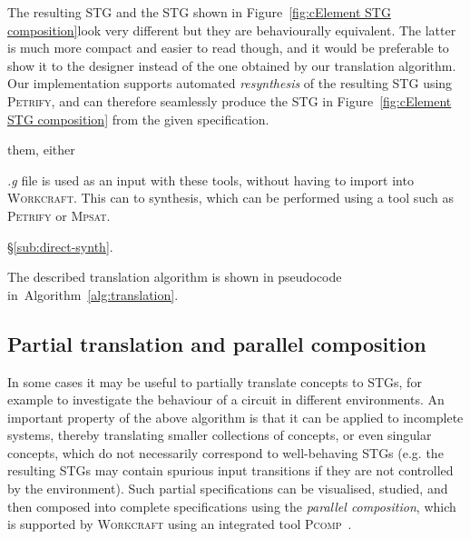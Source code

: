\documentclass[british, journal]{IEEEtran}
\newcommand{\noun}[1]{\textsc{#1}}
\begin{document}
The resulting STG and the STG shown in Figure~\ref{fig:cElement STG composition}look very different but they are behaviourally equivalent. The latter is much
more
compact and easier to read though, and it would be preferable to show it to the
designer instead of the one obtained by our translation algorithm. Our
implementation supports automated \emph{resynthesis} of the resulting STG
using \noun{Petrify}, and can therefore seamlessly produce the STG in
Figure~\ref{fig:cElement STG composition} from the given specification.

them,
either

\emph{.g} file is used as an input with these tools, without having to import
into \noun{Workcraft}. This can
to synthesis, which can be performed using a tool such as \noun{Petrify} or
\noun{Mpsat}.

\S\ref{sub:direct-synth}.

The described translation algorithm is shown in pseudocode
in~Algorithm~\ref{alg:translation}.

\vspace{-1mm}
\subsection{Partial translation and parallel composition}

In some cases it may be useful to partially translate concepts to STGs, for
example to investigate the behaviour of a circuit
in different environments. An important property of the above algorithm is
that it can be applied to incomplete systems, thereby translating
smaller collections of concepts, or even singular concepts, which do not
necessarily correspond to well-behaving STGs (e.g. the resulting STGs may
contain
spurious input transitions if they are not controlled by the environment).
Such partial specifications can be visualised, studied, and then composed into
complete specifications using the \emph{parallel composition}, which is
supported
by \noun{Workcraft} using an integrated tool \noun{Pcomp}~\cite{PCOMP}.
\end{document}
